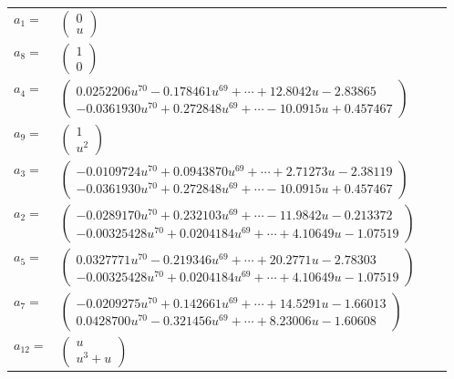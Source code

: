 \documentclass[1p]{elsarticle_modified}
\theoremstyle{definition}
\begin{document}
\begin{tabular}{m{7pt} m{180pt} m{7pt} m{180pt} }
\flushright $a_{1}=$&$\begin{pmatrix}0\\u\end{pmatrix}$ \\
\flushright $a_{8}=$&$\begin{pmatrix}1\\0\end{pmatrix}$ \\
\flushright $a_{4}=$&$\begin{pmatrix}0.0252206 u^{70}-0.178461 u^{69}+\cdots+12.8042 u-2.83865\\-0.0361930 u^{70}+0.272848 u^{69}+\cdots-10.0915 u+0.457467\end{pmatrix}$ \\
\flushright $a_{9}=$&$\begin{pmatrix}1\\u^2\end{pmatrix}$ \\
\flushright $a_{3}=$&$\begin{pmatrix}-0.0109724 u^{70}+0.0943870 u^{69}+\cdots+2.71273 u-2.38119\\-0.0361930 u^{70}+0.272848 u^{69}+\cdots-10.0915 u+0.457467\end{pmatrix}$ \\
\flushright $a_{2}=$&$\begin{pmatrix}-0.0289170 u^{70}+0.232103 u^{69}+\cdots-11.9842 u-0.213372\\-0.00325428 u^{70}+0.0204184 u^{69}+\cdots+4.10649 u-1.07519\end{pmatrix}$ \\
\flushright $a_{5}=$&$\begin{pmatrix}0.0327771 u^{70}-0.219346 u^{69}+\cdots+20.2771 u-2.78303\\-0.00325428 u^{70}+0.0204184 u^{69}+\cdots+4.10649 u-1.07519\end{pmatrix}$ \\
\flushright $a_{7}=$&$\begin{pmatrix}-0.0209275 u^{70}+0.142661 u^{69}+\cdots+14.5291 u-1.66013\\0.0428700 u^{70}-0.321456 u^{69}+\cdots+8.23006 u-1.60608\end{pmatrix}$ \\
\flushright $a_{12}=$&$\begin{pmatrix}u\\u^3+u\end{pmatrix}$ \\

\end{tabular}
\end{document}
